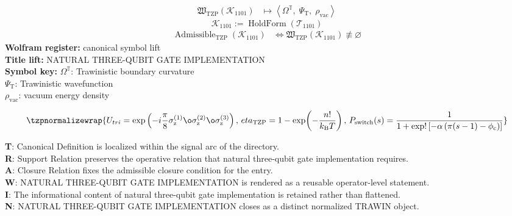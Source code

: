 \noindent
\begin{minipage}[t]{0.48\linewidth}
\begingroup
\small
\[
\begin{aligned}
\mathfrak{W}_{\mathrm{TZP}}\!\left(\mathcal{K}_{1101}\right)
&\longmapsto
\left\langle \Omega^{\mathbb{T}},\; \Psi_{\mathrm{T}},\; \rho_{\mathrm{vac}} \right\rangle
\end{aligned}
\]
\[
\mathcal{K}_{1101}
:=
\operatorname{HoldForm}\!\left(\mathcal{T}_{1101}\right)
\]
\[
\begin{aligned}
\operatorname{Admissible}_{\mathrm{TZP}}\!\left(\mathcal{K}_{1101}\right)
&\Longleftrightarrow
\mathfrak{W}_{\mathrm{TZP}}\!\left(\mathcal{K}_{1101}\right)\not\equiv\varnothing
\end{aligned}
\]
\textbf{Wolfram register:} canonical symbol lift\\
\textbf{Title lift:} NATURAL THREE-QUBIT GATE IMPLEMENTATION\\
\textbf{Symbol key:} \(\Omega^{\mathbb{T}}\): Trawinistic boundary curvature\\ \(\Psi_{\mathrm{T}}\): Trawinistic wavefunction\\ \(\rho_{\mathrm{vac}}\): vacuum energy density
\par
\endgroup
\end{minipage}\hfill
\begin{minipage}[t]{0.48\linewidth}
\[
\tzpnormalizewrap{U_{tri} = \exp\left( -i\frac{\pi}{8} \sigma_{\mathrm{z}}^{(1)} \o\sigma_{\mathrm{z}}^{(2)} \o\sigma_{\mathrm{z}}^{(3)} \right),\,eta_{\mathrm{TZP}} = 1 - \exp\!\left( - \frac{n!}{k_{\mathrm{B}} T} \right),\,P_{\mathrm{switch}}(s) = \frac{1}{1+\exp!\left[-\alpha\left(\pi(s-1)-\phi_{\mathrm{c}}\right)\right]}}
\]

\small
\textbf{T}: Canonical Definition is localized within the signal arc of the directory.\\
\textbf{R}: Support Relation preserves the operative relation that natural three-qubit gate implementation requires.\\
\textbf{A}: Closure Relation fixes the admissible closure condition for the entry.\\
\textbf{W}: NATURAL THREE-QUBIT GATE IMPLEMENTATION is rendered as a reusable operator-level statement.\\
\textbf{I}: The informational content of natural three-qubit gate implementation is retained rather than flattened.\\
\textbf{N}: NATURAL THREE-QUBIT GATE IMPLEMENTATION closes as a distinct normalized TRAWIN object.
\normalsize
\end{minipage}

